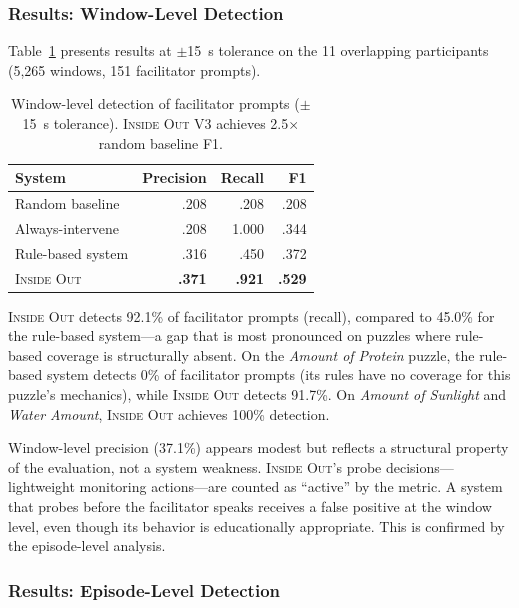 \subsubsection{Results: Window-Level Detection}

Table~\ref{tab:facilitator_benchmark} presents results at $\pm$15~s tolerance on the 11 overlapping participants (5,265 windows, 151 facilitator prompts).

\begin{table}[t]
\centering
\caption{Window-level detection of facilitator prompts ($\pm$15~s tolerance). \textsc{Inside Out} V3 achieves 2.5$\times$ random baseline F1.}
\label{tab:facilitator_benchmark}
\small
\begin{tabular}{lrrr}
\toprule
\textbf{System} & \textbf{Precision} & \textbf{Recall} & \textbf{F1} \\
\midrule
Random baseline       & .208 & .208 & .208 \\
Always-intervene      & .208 & 1.000 & .344 \\
Rule-based system     & .316 & .450 & .372 \\
\textsc{Inside Out}   & \textbf{.371} & \textbf{.921} & \textbf{.529} \\
\bottomrule
\end{tabular}
\end{table}

\textsc{Inside Out} detects 92.1\% of facilitator prompts (recall), compared to 45.0\% for the rule-based system---a gap that is most pronounced on puzzles where rule-based coverage is structurally absent. On the \emph{Amount of Protein} puzzle, the rule-based system detects 0\% of facilitator prompts (its rules have no coverage for this puzzle's mechanics), while \textsc{Inside Out} detects 91.7\%. On \emph{Amount of Sunlight} and \emph{Water Amount}, \textsc{Inside Out} achieves 100\% detection.

Window-level precision (37.1\%) appears modest but reflects a structural property of the evaluation, not a system weakness. \textsc{Inside Out}'s probe decisions---lightweight monitoring actions---are counted as ``active'' by the metric. A system that probes before the facilitator speaks receives a false positive at the window level, even though its behavior is educationally appropriate. This is confirmed by the episode-level analysis.

\subsubsection{Results: Episode-Level Detection}

